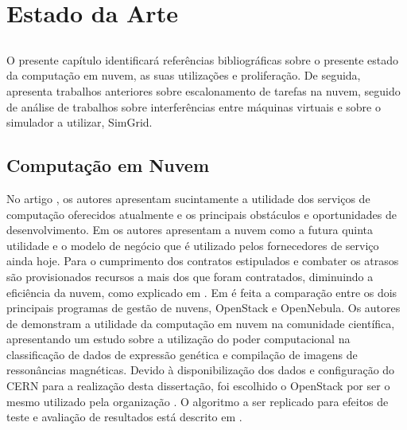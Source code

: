 \chapter{Estado da Arte} \label{chap:sota}

\section*{}

O presente capítulo identificará referências bibliográficas sobre o presente estado da computação em nuvem, as suas utilizações e proliferação. De seguida, apresenta trabalhos anteriores sobre escalonamento de tarefas na nuvem, seguido de análise de trabalhos sobre interferências entre máquinas virtuais e sobre o simulador a utilizar, SimGrid. 



\section{Computação em Nuvem}

No artigo \cite{armbrust2010view}, os autores apresentam sucintamente a utilidade dos serviços de computação oferecidos atualmente e os principais obstáculos e oportunidades de desenvolvimento. Em \cite{buyya2009cloud} os autores apresentam a nuvem como a futura quinta utilidade e o modelo de negócio que é utilizado pelos fornecedores de serviço ainda hoje. Para o cumprimento dos contratos estipulados e combater os atrasos são provisionados recursos a mais dos que foram contratados, diminuindo a eficiência da nuvem, como explicado em \cite{armbrust2010view, nathuji2010q ,corradi2012vm}. Em \cite{wen2012comparison} é feita a comparação entre os dois principais programas de gestão de nuvens, OpenStack e OpenNebula. Os autores de \cite{vecchiola2009high} demonstram a utilidade da computação em nuvem na comunidade científica, apresentando um estudo sobre a utilização do poder computacional na classificação de dados de expressão genética e compilação de imagens de ressonâncias magnéticas. Devido à disponibilização dos dados e configuração do CERN para a realização desta dissertação, foi escolhido o OpenStack por ser o mesmo utilizado pela organização \cite{openstackcern}. O algoritmo a ser replicado para efeitos de teste e avaliação de resultados está descrito em \cite{gong2012nova}.

